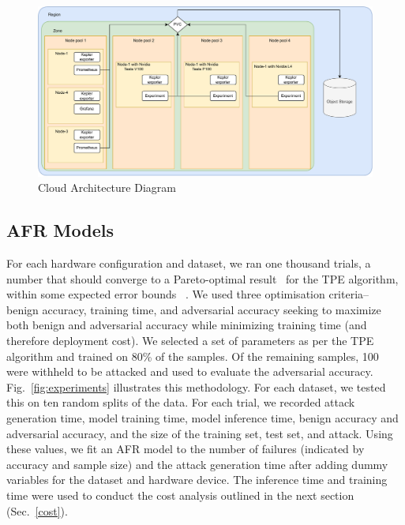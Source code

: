 \documentclass[conference]{IEEEtran}
\begin{document}
\begin{figure}
    \centering
    \includegraphics[width=.8\textwidth]{plots/architecture.pdf}
    \caption{Cloud Architecture Diagram}
    \label{fig:architecture}
\end{figure}


\subsection{AFR Models}

For each hardware configuration and dataset, we ran one thousand trials, a number that should converge to a Pareto-optimal result~\cite{ozaki2020multiobjective,zitzler2008quality} for the TPE algorithm, within some expected error bounds ~\cite{legriel2010approximating}. We used three optimisation criteria-- benign accuracy, training time, and adversarial accuracy seeking to maximize both benign and adversarial accuracy while minimizing training time (and therefore deployment cost). We selected a set of parameters as per the TPE algorithm and trained on 80\% of the samples. Of the remaining samples, 100 were withheld to be attacked and used to evaluate the adversarial accuracy. Fig.~\ref{fig:experiments} illustrates this methodology. For each dataset, we tested this on ten random splits of the data. For each trial, we recorded attack generation time, model training time, model inference time, benign accuracy and adversarial accuracy, and the size of the training set, test set, and attack. Using these values, we fit an AFR model to the number of failures (indicated by accuracy and sample size) and the attack generation time after adding dummy variables for the dataset and hardware device. The inference time and training time were used to conduct the cost analysis outlined in the next section (Sec.~\ref{cost}). 
\end{document}
